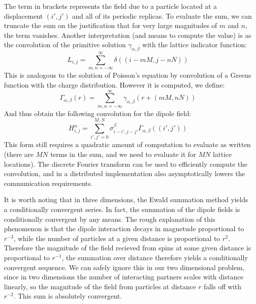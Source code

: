 \documentclass{article}
\theoremstyle{definition}
\begin{document}
The term in brackets represents the field due to a particle located at a
displacement $(i',j')$ and all of its periodic replicas. To evaluate the sum, we
can truncate the sum on the justification that for very large magnitudes of $m$
and $n$, the term vanishes. Another interpretation (and means to compute the
value) is as the convolution of the primitive solution $\gamma_{\alpha,\beta}$
with the lattice indicator function:
\begin{displaymath}
L_{i,j} = \sum_{m,n = -\infty}^\infty \delta((i - mM, j - nN))
\end{displaymath}
This is analogous to the solution of Poisson's equation by convolution of a
Greens function with the charge distribution. However it is computed, we define:
\begin{displaymath}
\Gamma_{\alpha,\beta}(r) = \sum_{m,n=-\infty}^{\infty} \gamma_{\alpha,\beta}
\left( r + (mM,nN) \right)
\end{displaymath}
And thus obtain the following convolution for the dipole field:
\begin{equation}\label{eqn:convLR}
H_{i,j}^\alpha = \sum_{i',j' = 0}^{M,N} \sigma_{i-i',j-j'}^\beta
\Gamma_{\alpha,\beta}\left((i',j')\right)
\end{equation}
This form still requires a quadratic amount of computation to evaluate as
written (there are $MN$ terms in the sum, and we need to evaluate it for $MN$
lattice locations). The discrete Fourier transform can be used to efficiently
compute the convolution, and in a distributed implementation also asymptotically
lowers the communication requirements.

It is worth noting that in three dimensions, the Ewald summation method yields a
conditionally convergent series. In fact, the summation of the dipole fields is
conditionally convergent by any means. The rough explanation of this phenomenon
is that the dipole interaction decays in magnetude proportional to $r^{-3}$,
while the number of particles at a given distance is proportional to $r^2$.
Therefore the magnitude of the field recieved from spins at some given distance
is proportional to $r^{-1}$, the summation over distance therefore yields a
conditionally convergent sequence. We can safely ignore this in our two
dimensional problem, since in two dimensions the number of interacting partners
scales with distance linearly, so the magnitude of the field from particles at
distance $r$ falls off with $r^{-2}$. This sum is absolutely convergent.
\end{document}
